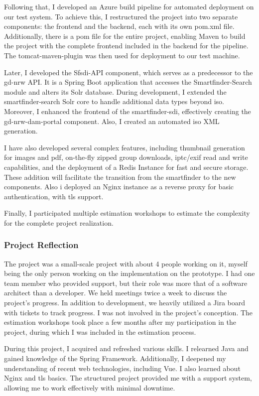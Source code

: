 \documentclass[11pt, titlepage, a4paper]{article}
\begin{document}
Following that, I developed an Azure build pipeline for automated deployment on our test system.  To achieve this, I restructured the project into two separate components: the frontend and the backend, each with its own pom.xml file. Additionally, there is a pom file for the entire project, enabling Maven to build the project with the complete frontend included in the backend for the pipeline. The tomcat-maven-plugin was then used for deployment to our test machine.

Later, I developed the Sfsdi-API component, which serves as a predecessor to the gd-nrw API. It is a Spring Boot application that accesses the Smartfinder-Search module and alters its Solr database. During development, I extended the smartfinder-search Solr core to handle additional data types beyond \gls{iso}. Moreover, I enhanced the frontend of the smartfinder-sdi, effectively creating the gd-nrw-dam-portal component.
Also, I created an automated \gls{iso} XML generation.

I have also developed several complex features, including thumbnail generation for images and \gls{pdf}, on-the-fly zipped group downloads, \gls{iptc}/\gls{exif} read and write capabilities, and the deployment of a Redis Instance for fast and secure storage. These addition will facilitate the transition from the smartfinder to the new components. Also i deployed an Nginx instance as a reverse proxy for basic authentication, with \gls{tls} support.

Finally, I participated multiple estimation workshops to estimate the complexity for the complete project realization.

\subsubsection{Project Reflection}
The project was a small-scale project with about 4 people working on it, myself being the only person working on the implementation on the prototype. I had one team member who provided support, but their role was more that of a software architect than a developer. 
We held meetings twice a week to discuss the project's progress. In addition to development, we heavily utilized a Jira board with tickets to track progress. I was not involved in the project's conception.
The estimation workshops took place a few months after my participation in the project, during which I was included in the estimation process.

During this project, I acquired and refreshed various skills. I relearned Java and gained knowledge of the Spring Framework. Additionally, I deepened my understanding of recent web technologies, including Vue. I also learned about Nginx and \gls{tls} basics.
The structured project provided me with a support system, allowing me to work effectively with minimal downtime.
\end{document}
